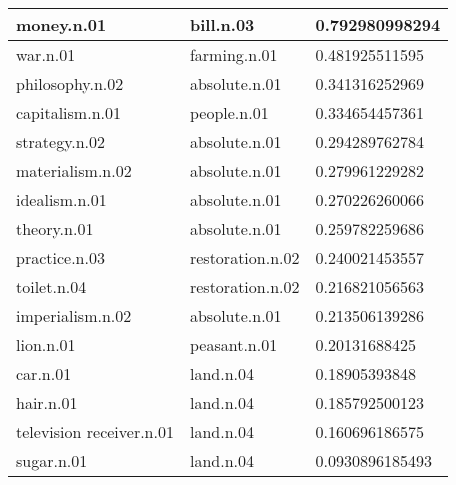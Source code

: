 \begin{center}
\begin{tabular}{ | l | l | l |}
money.n.01 & bill.n.03 & 0.792980998294 \\ \hline
war.n.01 & farming.n.01 & 0.481925511595 \\ \hline
philosophy.n.02 & absolute.n.01 & 0.341316252969 \\ \hline
capitalism.n.01 & people.n.01 & 0.334654457361 \\ \hline
strategy.n.02 & absolute.n.01 & 0.294289762784 \\ \hline
materialism.n.02 & absolute.n.01 & 0.279961229282 \\ \hline
idealism.n.01 & absolute.n.01 & 0.270226260066 \\ \hline
theory.n.01 & absolute.n.01 & 0.259782259686 \\ \hline
practice.n.03 & restoration.n.02 & 0.240021453557 \\ \hline
toilet.n.04 & restoration.n.02 & 0.216821056563 \\ \hline
imperialism.n.02 & absolute.n.01 & 0.213506139286 \\ \hline
lion.n.01 & peasant.n.01 & 0.20131688425 \\ \hline
car.n.01 & land.n.04 & 0.18905393848 \\ \hline
hair.n.01 & land.n.04 & 0.185792500123 \\ \hline
television receiver.n.01 & land.n.04 & 0.160696186575 \\ \hline
sugar.n.01 & land.n.04 & 0.0930896185493 \\ \hline
\end{tabular}
\end{center}
